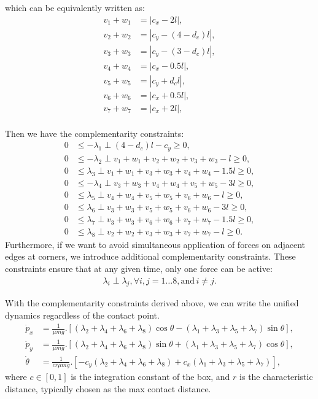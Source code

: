 which can be equivalently written as:
\begin{align}
    v_1 + w_1 &= |c_x -2l|,\\
    v_2 + w_2 &= |c_y -(4-d_c)l|,\\
    v_3 + w_3 &= |c_y -(3-d_c)l|,\\
    v_4 + w_4 &= |c_x -0.5l|,\\
    v_5 + w_5 &= |c_y + d_cl|,\\
    v_6 + w_6 &= |c_x + 0.5l|,\\
    v_7 + w_7 &= |c_x + 2l|,\\
\end{align}

Then we have the complementarity constraints:
\begin{align}
    0&\leq -\lambda_1 \perp (4-d_c)l - c_y \geq 0,\\
    0&\leq -\lambda_2  \perp v_1 + w_1 + v_2 + w_2 + v_3  + w_3 - l \geq 0 ,\\
    0&\leq \lambda_3  \perp v_1 + w_1 + v_3 + w_3 + v_4 + w_4 - 1.5l \geq 0,\\
    0&\leq -\lambda_4  \perp v_3 + w_3 + v_4 + w_4 + v_5 + w_5 - 3l \geq 0,\\
    0&\leq \lambda_5  \perp v_4 + w_4 + v_5 + w_5 + v_6 + w_6 - l \geq 0,\\
    0&\leq \lambda_6  \perp v_3 + w_3 + v_5 + w_5 + v_6 + w_6 - 3l \geq 0,\\
    0&\leq \lambda_7  \perp v_3 + w_3 + v_6 + w_6 + v_7 + w_7 - 1.5l \geq 0,\\
    0&\leq \lambda_8  \perp v_2 + w_2 + v_3 + w_3 + v_7 + w_7 - l \geq 0.
\end{align}
Furthermore, if we want to avoid simultaneous application of forces on adjacent edges at corners,
we introduce additional complementarity constraints. These constraints ensure that at any given time, only one force can be active:
\begin{align}
    \lambda_i \perp \lambda_j, \forall i,j = 1\ldots 8, \text{and}\,i\neq j.
\end{align}

With the complementarity constraints derived above, we can write the unified dynamics regardless of the contact point.
\begin{align}
\dot{p}_x &= \frac{1}{\mu m g}.\left[(\lambda_2+\lambda_4+\lambda_6+\lambda_8)\cos\theta - (\lambda_1 + \lambda_3+\lambda_5+\lambda_7)\sin\theta\right],\\
\dot{p}_y &= \frac{1}{\mu m g}.\left[(\lambda_2+\lambda_4+\lambda_6+\lambda_8)\sin\theta + (\lambda_1 + \lambda_3+\lambda_5+\lambda_7)\cos\theta\right],\\
\dot{\theta} &= \frac{1}{c r \mu m g}.\left[-c_y(\lambda_2+\lambda_4+\lambda_6+\lambda_8) + c_x(\lambda_1 + \lambda_3+\lambda_5+\lambda_7)\right],    
\end{align}
where $c \in [0,1]$ is the integration constant of the box, and $r$ is the characteristic distance, typically
chosen as the max contact distance.

